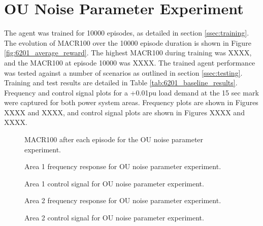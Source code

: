 \section{OU Noise Parameter Experiment}
The agent was trained for 10000 episodes, as detailed in section \ref{ssec:training}. The evolution of MACR100 over the 10000 episode duration is shown in Figure \ref{fig:6201_average_reward}. The highest MACR100 during training was XXXX, and the MACR100 at episode 10000 was XXXX. The trained agent performance was tested against a number of scenarios as outlined in section \ref{ssec:testing}. Training and test results are detailed in Table \ref{tab:6201_baseline_results}. Frequency and control signal plots for a +0.01pu load demand at the 15 sec mark were captured for both power system areas. Frequency plots are shown in Figures XXXX and XXXX, and control signal plots are shown in Figures XXXX and XXXX.

\vspace{2cm}

\begin{figure}[h]
	\centering
	
	\caption{MACR100 after each episode for the OU noise parameter experiment.}
\end{figure}



\begin{figure}[h]
	\centering
	
	
	\vspace{-0.5cm}
	\caption{Area 1 frequency response for OU noise parameter experiment.}
	
	\vspace{0.5cm}
	
	
	\vspace{-0.5cm}
	\caption{Area 1 control signal for OU noise parameter experiment.}
	
	\vspace{0.5cm}
	
	
	\vspace{-0.5cm}
	\caption{Area 2 frequency response for OU noise parameter experiment.}
	
	\vspace{0.5cm}
				
	
	\vspace{-0.5cm}
	\caption{Area 2 control signal for OU noise parameter experiment.}
\end{figure}